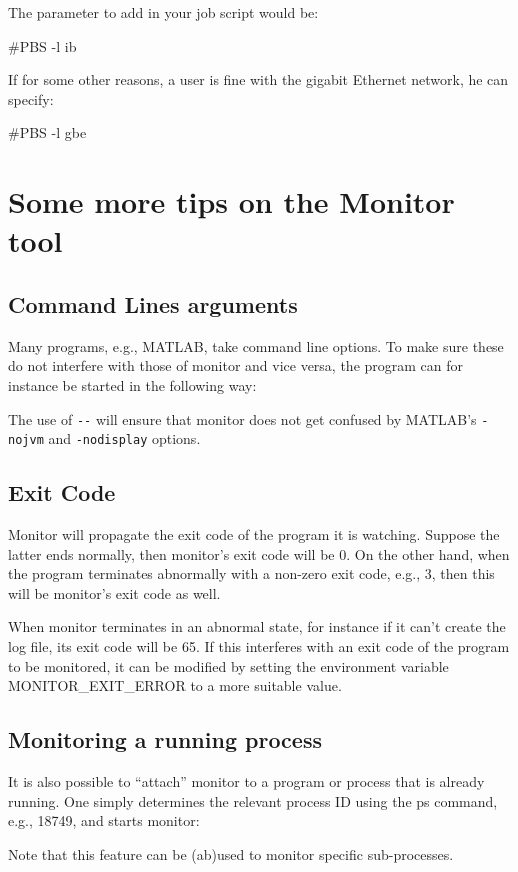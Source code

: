 The parameter to add in your job script would be:

\begin{prompt}
#PBS -l ib
\end{prompt}

If for some other reasons, a user is fine with the gigabit Ethernet network, he
can specify:

\begin{prompt}
#PBS -l gbe
\end{prompt}

\ifgent
\else
  \section{Some more tips on the Monitor tool}

  \subsection{Command Lines arguments}

  Many programs, e.g., MATLAB, take command line options. To make sure these do
  not interfere with those of monitor and vice versa, the program can for
  instance be started in the following way:

\begin{prompt}
\end{prompt}

  The use of \lstinline|--| will ensure that monitor does not get confused by MATLAB's \lstinline|-nojvm| and \lstinline|-nodisplay| options.

  \subsection{Exit Code}

  Monitor will propagate the exit code of the program it is watching. Suppose the
  latter ends normally, then monitor's exit code will be 0. On the other hand,
  when the program terminates abnormally with a non-zero exit code, e.g., 3, then
  this will be monitor's exit code as well.

  When monitor terminates in an abnormal state, for instance if it can't
  create the log file, its exit code will be 65. If this interferes with an exit
  code of the program to be monitored, it can be modified by setting the
  environment variable MONITOR\_EXIT\_ERROR to a more suitable value.

  \subsection{Monitoring a running process}

  It is also possible to ``attach'' monitor to a program or process that is already
  running. One simply determines the relevant process ID using the ps command,
  e.g., 18749, and starts monitor:

\begin{prompt}
\end{prompt}

  Note that this feature can be (ab)used to monitor specific sub-processes.
\fi
